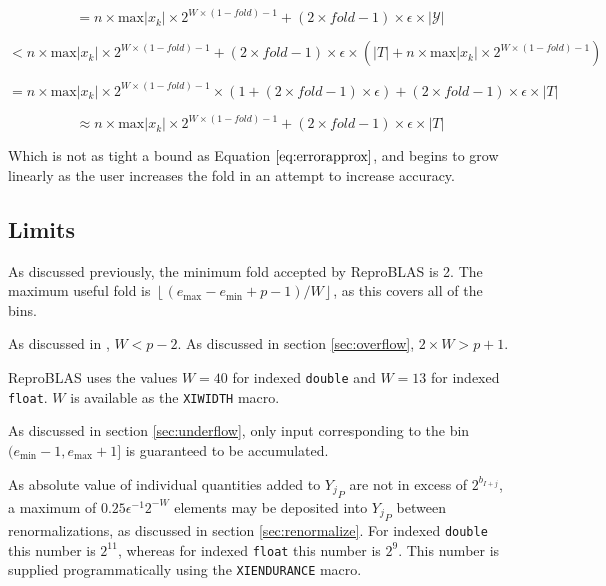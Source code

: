 \documentclass[12pt]{article}
\providecommand{\floor}[1]{\left \lfloor #1 \right \rfloor }
\providecommand{\min}{\ensuremath{\text{min}}}
\providecommand{\max}{\ensuremath{\text{max}}}
\theoremstyle{plain}
\begin{document}
    \begin{equation*}
    = n \times \max|x_k|\times 2^{W \times (1 - fold) - 1} + (2 \times fold - 1) \times \epsilon \times |\mathcal{Y}|
    \end{equation*}

    \begin{equation*}
    < n \times \max|x_k|\times 2^{W \times (1 - fold) - 1} + (2 \times fold - 1) \times \epsilon \times (|T| + n \times \max|x_k|\times 2^{W \times (1 - fold) - 1})
    \end{equation*}

    \begin{equation*}
    = n \times \max|x_k|\times 2^{W \times (1 - fold) - 1}\times (1 + (2 \times fold - 1)\times \epsilon) + (2 \times fold - 1) \times \epsilon \times |T|
    \end{equation*}

    \begin{equation*}
    \approx n \times \max|x_k|\times 2^{W \times (1 - fold) - 1} + (2 \times fold - 1) \times \epsilon \times |T|
    \end{equation*}

    Which is not as tight a bound as Equation $\ref{eq:errorapprox}$, and begins to grow linearly as the user increases the fold in an attempt to increase accuracy.

  \subsection{Limits}
    \label{sec:limits}
    As discussed previously, the minimum fold accepted by ReproBLAS is 2. The maximum useful fold is $\floor{(e_{\max} - e_{\min} + p - 1)/W}$, as this covers all of the bins.

    As discussed in \cite{repsum}, $W < p - 2$. As discussed in section \ref{sec:overflow}, $2\times W > p + 1$.

    ReproBLAS uses the values $W = 40$ for indexed \verb|double| and $W = 13$ for indexed \verb|float|. $W$ is available as the \verb|XIWIDTH| macro.

    As discussed in section \ref{sec:underflow}, only input corresponding to the bin $(e_{\min} - 1, e_{\max} + 1]$ is guaranteed to be accumulated.

    As absolute value of individual quantities added to ${Y_j}_P$ are not in excess of $2^{b_{I + j}}$, a maximum of $0.25\epsilon^{-1}2^{-W}$ elements may be deposited into ${Y_j}_P$ between renormalizations, as discussed in section \ref{sec:renormalize}. For indexed \verb|double| this number is $2^{11}$, whereas for indexed \verb|float| this number is $2^9$. This number is supplied programmatically using the \verb|XIENDURANCE| macro.
\end{document}
